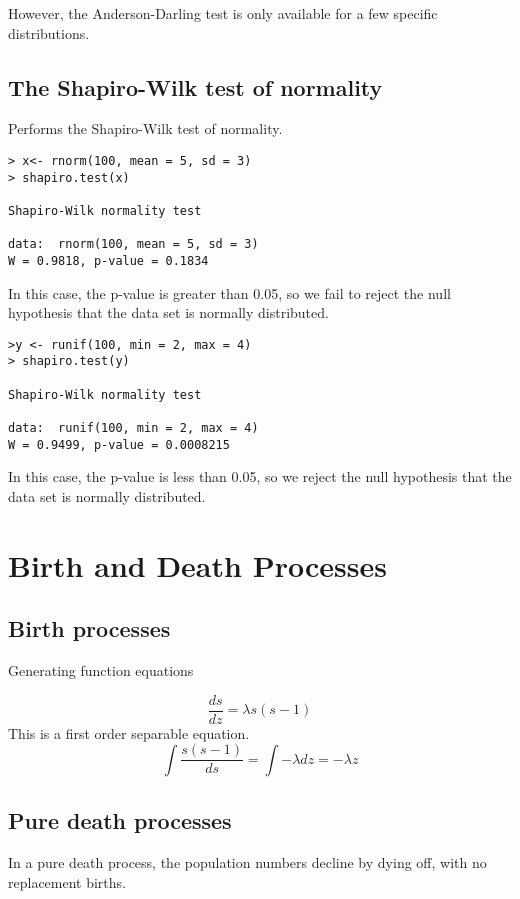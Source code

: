 However, the Anderson-Darling test is only available for a few specific distributions.


\section{The Shapiro-Wilk test of normality}
Performs the Shapiro-Wilk test of normality.
\begin{verbatim}
> x<- rnorm(100, mean = 5, sd = 3)
> shapiro.test(x)

Shapiro-Wilk normality test

data:  rnorm(100, mean = 5, sd = 3)
W = 0.9818, p-value = 0.1834
\end{verbatim}
In this case, the p-value is greater than 0.05, so we fail to reject the null hypothesis that the
data set is normally distributed.
\begin{verbatim}
>y <- runif(100, min = 2, max = 4)
> shapiro.test(y)

Shapiro-Wilk normality test

data:  runif(100, min = 2, max = 4)
W = 0.9499, p-value = 0.0008215
\end{verbatim}
In this case, the p-value is less than 0.05, so we reject the null hypothesis that the
data set is normally distributed.




\chapter{Birth and Death Processes}


\section{Birth processes}
Generating function equations

\[
\frac{ds}{dz} = \lambda s(s-1)
\]
This is a first order separable equation.
\[
\int \frac{s(s-1)}{ds} = \int -\lambda dz = -\lambda z
\]


\section{Pure death processes}
In a pure death process, the population numbers decline by dying
off, with no replacement births.

